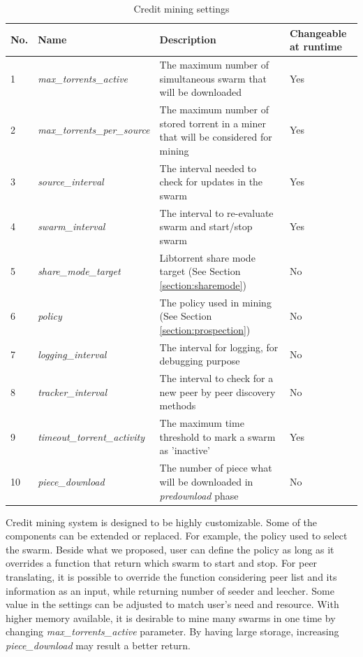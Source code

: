 \begin{table}[]
	\centering
	\caption{Credit mining settings}
	\label{tbl:cmsettings}
	\begin{adjustwidth}{-1.5cm}{}
	\begin{tabular}{|p{1cm}|p{4cm}|p{7cm}|p{2cm}|}
		\hline
		\rowcolor[HTML]{EFEFEF} 
		No. & Name & Description & Changeable at runtime \\ \hline
	1 & \textit{max\_torrents\_active} & The maximum number of simultaneous swarm that will be downloaded & Yes \\ \hline
	2 & \textit{max\_torrents\_per\_source} & The maximum number of stored torrent in a miner that will be considered for mining & Yes \\ \hline
	3 & \textit{source\_interval} & The interval needed to check for updates in the swarm & Yes \\ \hline
	4 & \textit{swarm\_interval} & The interval to re-evaluate swarm and start/stop swarm & Yes \\ \hline
	5 & \textit{share\_mode\_target} & Libtorrent share mode target (See Section \ref{section:sharemode}) & No \\ \hline
	6 & \textit{policy} & The policy used in mining (See Section \ref{section:prospection}) & No \\ \hline
	7 & \textit{logging\_interval} & The interval for logging, for debugging purpose & No \\ \hline
	8 & \textit{tracker\_interval} & The interval to check for a new peer by peer discovery methods & No \\ \hline
	9 & \textit{timeout\_torrent\_activity} & The maximum time threshold to mark a swarm as 'inactive' & Yes \\ \hline
	10 & \textit{piece\_download} & The number of piece what will be downloaded in \textit{predownload} phase & No \\ \hline
	\end{tabular}
	\end{adjustwidth}
\end{table}

Credit mining system is designed to be highly customizable. Some of the components can be extended or replaced. For example, the policy used to select the swarm. Beside what we proposed, user can define the policy as long as it overrides a function that return which swarm to start and stop. For peer translating, it is possible to override the function considering peer list and its information as an input, while returning number of seeder and leecher. Some value in the settings can be adjusted to match user's need and resource. With higher memory available, it is desirable to mine many swarms in one time by changing \textit{max\_torrents\_active} parameter. By having large storage, increasing \textit{piece\_download} may result a better return.


